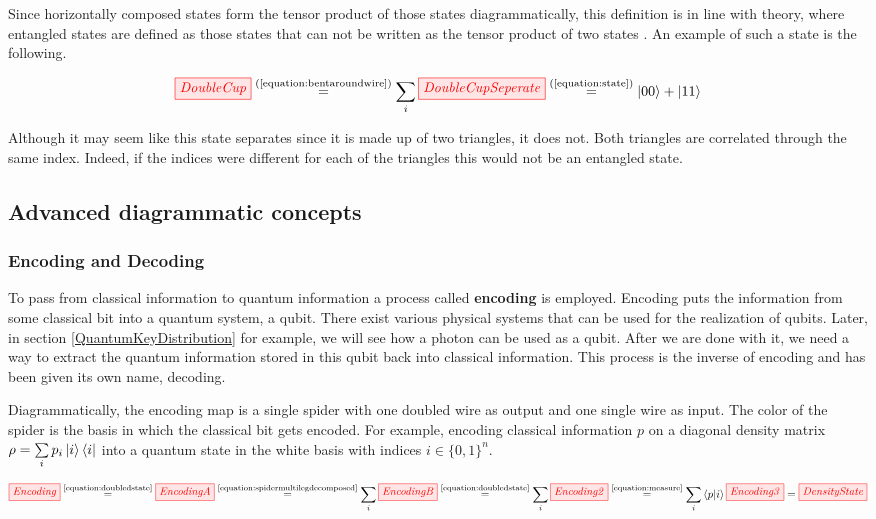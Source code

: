 \documentclass[]{article}
\newcommand{\equaltext}[1]{\ensuremath{\stackrel{\text{#1}}{=}}}
\begin{document}
Since horizontally composed states form the tensor product of those states diagrammatically, this definition is in line with theory, where entangled states are defined as those states that can not be written as the tensor product of two states \cite{Nielsen2011}. An example of such a state is the following.

\begin{equation}
\tikzfig{DoubleCup} \equaltext{(\ref{equation:bentaroundwire})} \sum\limits_{i} \tikzfig{DoubleCupSeperate} \equaltext{(\ref{equation:state})} \ket{00} + \ket{11}
\end{equation}

Although it may seem like this state separates since it is made up of two triangles, it does not. Both triangles are correlated through the same index. Indeed, if the indices were different for each of the triangles this would not be an entangled state.

\subsection{Advanced diagrammatic concepts}

\subsubsection{Encoding and Decoding}
\label{encodingdecoding}

To pass from classical information to quantum information a process called \textbf{encoding} is employed. Encoding puts the information from some classical bit into a quantum system, a qubit. There exist various physical systems that can be used for the realization of qubits. Later, in section \ref{QuantumKeyDistribution} for example, we will see how a photon can be used as a qubit. After we are done with it, we need a way to extract the quantum information stored in this qubit back into classical information. This process is the inverse of encoding and has been given its own name, decoding. 

Diagrammatically, the encoding map is a single spider with one doubled wire as output and one single wire as input. The color of the spider is the basis in which the classical bit gets encoded. For example, encoding classical information $p$ on a diagonal density matrix $\rho = \sum\limits_i p_i \ket{i}\bra{i}$ into a quantum state in the white basis with indices $i \in \{0,1\}^n$.

\begin{equation}
	\label{equation:Encoding}
	\tikzfig{Encoding} \equaltext{\ref{equation:doubledstate}} \tikzfig{EncodingA} \equaltext{\ref{equation:spidermultilegdecomposed}}
	\sum\limits_{i} \tikzfig{EncodingB} \equaltext{\ref{equation:doubledstate}} \sum\limits_{i} \tikzfig{Encoding2} \equaltext{\ref{equation:measure}} \sum\limits_{i} \bra{p}\ket{i} \tikzfig{Encoding3} = \tikzfig{DensityState}
\end{equation}
\end{document}
